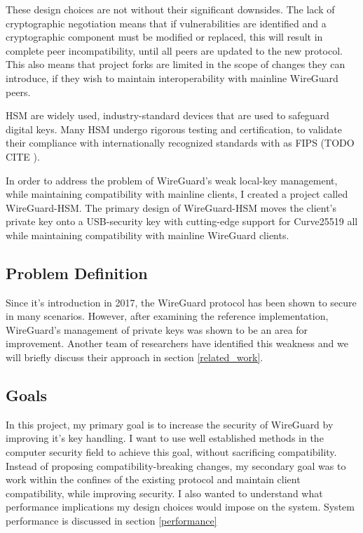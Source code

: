 \documentclass [11pt, proquest] {uwthesis}[2020/02/24]
\begin{document}
These design choices are not without their significant downsides. The lack of cryptographic negotiation means that if vulnerabilities are identified and a cryptographic component must be modified or replaced, this will result in complete peer incompatibility, until all peers are updated to the new protocol. This also means that project forks are limited in the scope of changes they can introduce, if they wish to maintain interoperability with mainline WireGuard peers.

HSM are widely used, industry-standard devices that are used to safeguard digital keys. Many HSM undergo rigorous testing and certification, to validate their compliance  with internationally recognized standards with as FIPS (TODO CITE ).

In order to address the problem of WireGuard's weak local-key management, while maintaining compatibility with mainline clients, I created a project called WireGuard-HSM. The primary design of WireGuard-HSM moves the client's private key onto a USB-security key with cutting-edge support for Curve25519 all while maintaining compatibility with mainline WireGuard clients. 

\subsection{Problem Definition} \label{problem_definition}
Since it's introduction in 2017, the WireGuard protocol has been shown to secure in many scenarios. However, after examining the reference implementation, WireGuard's management of private keys was shown to be an area for improvement. Another team of researchers have identified this weakness and we will briefly discuss their approach in section \ref{related_work}.

\subsection{Goals}
In this project, my primary goal is to increase the security of WireGuard by improving it's key handling. I want to use well established methods in the computer security field to achieve this goal, without sacrificing compatibility. Instead of proposing compatibility-breaking changes, my secondary goal was to work within the confines of the existing protocol and maintain client compatibility, while improving security. I also wanted to understand what performance implications my design choices would impose on the system. System performance is discussed in section \ref{performance}
\end{document}
